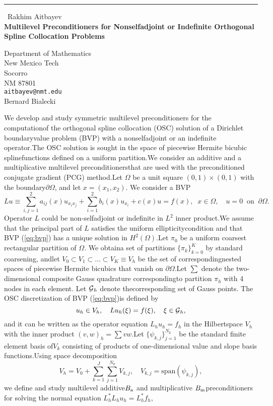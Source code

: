 \documentclass{report}
\begin{document}
\begin{center}
\rule{6in}{1pt} \
{\large Rakhim Aitbayev \\
{\bf Multilevel Preconditioners for Nonselfadjoint or Indefinite Orthogonal Spline Collocation Problems}}

Department of Mathematics \\ New Mexico Tech \\ Socorro \\ NM 87801
\\
{\tt aitbayev@nmt.edu}\\
Bernard Bialecki\end{center}

\newtheorem{theorem}{Theorem}\newcommand{\GP}{\mbox{${\cal G}$}}\newcommand{\SH}{\mbox{$\scriptscriptstyle H^{2}(\Omega)$}}\newcommand{\SL}{\mbox{$\scriptscriptstyle L^{2}(\Omega)$}}We develop and study symmetric multilevel preconditioners for the computationof the orthogonal spline collocation (OSC) solution of a Dirichlet boundaryvalue problem (BVP) with a nonselfadjoint or an indefinite operator.The OSC solution is sought in the space of piecewise Hermite bicubic splinefunctions defined on a uniform partition.We consider an additive and a multiplicative multilevel preconditionersthat are used with the preconditioned conjugate gradient (PCG) method.Let $\Omega$ be a unit square $(0,1)\times(0,1)$ with the boundary$\partial\Omega$,
and let $x=(x_1,x_2)$.
We consider a BVP\begin{equation}\label{eq:bvp}Lu\equiv\sum_{i,j=1}^{2} a_{ij}(x)u_{x_ix_j}+\sum_{i=1}^{2} b_i(x) u_{x_i}+c(x)u = f(x),\;\;x\in\Omega,\quad u=0 \;\;\mbox{on}\;\;\partial\Omega.\end{equation}Operator $L$ could be non-selfadjoint or indefinite in $L^2$ inner product.We assume that the principal part of $L$ satisfies the uniform ellipticitycondition and that BVP (\ref{eq:bvp}) has a unique solution in $H^2(\Omega)$.Let $\pi_0$ be a uniform coarsest rectangular partition of $\Omega$.
We obtaina set of partitions $\{\pi_k\}_{k=0}^{K}$ by standard coarsening,
andlet $V_0\subset V_1\subset\ldots\subset V_K\equiv V_h$ be the set of correspondingnested spaces of piecewise Hermite bicubics that vanish on $\partial\Omega$.Let $\sum$ denote the two-dimensional composite Gauss quadrature correspondingto partition $\pi_h$ with 4 nodes in each element.
Let $\GP_h$ denote thecorresponding set of Gauss points.
The OSC discretization of BVP (\ref{eq:bvp})is defined by\begin{equation}\label{eq:osc}u_h\in V_h,\quad Lu_h(\xi)=f(\xi),\quad\xi\in\GP_h,\end{equation}and it can be written as the operator equation $L_hu_h=f_h$ in the Hilbertspace $V_h$ with the inner product $(v,w)_h=\sum vw$.Let $\{\psi_{k,j}\}_{j=1}^{N_k}$ be the standard finite element basis of$V_k$ consisting of products of one-dimensional value and slope basis functions.Using space decomposition\[V_h=V_0+\sum_{k=1}^{J}\sum_{j=1}^{N_k}V_{k,j},
\quad V_{k,j}= \mbox{span}(\psi_{k,j}),\]we define and study multilevel additive$B_{\textup{\scriptsize a}}$ and multiplicative $B_{\textup{\scriptsize m}}$preconditioners for solving the normal equation $L_h^*L_hu_h=L_h^*f_h$,
\end{document}
